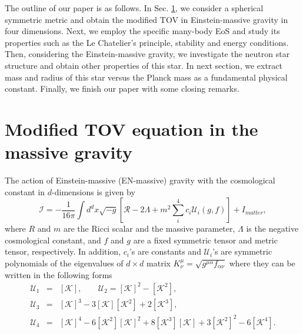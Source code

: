 \documentclass[aps]{revtex4}
\begin{document}
The outline of our paper is as follows. In Sec. \ref{ModTOV}, we consider a
spherical symmetric metric and obtain the modified TOV in Einstein-massive
gravity in four dimensions. Next, we employ the specific many-body EoS and
study its properties such as the Le Chatelier's principle, stability and
energy conditions. Then, considering the Einstein-massive gravity, we
investigate the neutron star structure and obtain other properties of this
star. In next section, we extract mass and radius of this star versus the
Planck mass as a fundamental physical constant. Finally, we finish our paper
with some closing remarks.

\section{Modified TOV equation in the massive gravity}\label{ModTOV}

The action of Einstein-massive (EN-massive) gravity with the cosmological
constant in $d$-dimensions is given by
\begin{equation}
\mathcal{I}=-\frac{1}{16\pi }\int d^{d}x\sqrt{-g}\left[ \mathcal{R}-2\Lambda
+m^{2}\sum_{i}^{4}c_{i}\mathcal{U}_{i}(g,f)\right] +I_{matter},
\label{Action}
\end{equation}%
where $R$ and $m$ are the Ricci scalar and the massive parameter, $\Lambda $
is the negative cosmological constant, and $f$ and $g$ are a fixed symmetric
tensor and metric tensor, respectively. In addition, $c_{i}$'s are constants
and $\mathcal{U}_{i}$'s are symmetric polynomials of the eigenvalues of $%
d\times d$ matrix $K_{\nu }^{\mu }=\sqrt{g^{\mu \alpha }f_{\alpha \nu }}$
where they can be written in the following forms
\begin{eqnarray}
\mathcal{U}_{1} &=&\left[ \mathcal{K}\right] ,\;\;\;\;\;\;\;\mathcal{U}_{2}=%
\left[ \mathcal{K}\right] ^{2}-\left[ \mathcal{K}^{2}\right] ,  \nonumber \\
\mathcal{U}_{3} &=&\left[ \mathcal{K}\right] ^{3}-3\left[ \mathcal{K}\right] %
\left[ \mathcal{K}^{2}\right] +2\left[ \mathcal{K}^{3}\right] ,  \nonumber \\
\mathcal{U}_{4} &=&\left[ \mathcal{K}\right] ^{4}-6\left[ \mathcal{K}^{2}%
\right] \left[ \mathcal{K}\right] ^{2}+8\left[ \mathcal{K}^{3}\right] \left[
\mathcal{K}\right] +3\left[ \mathcal{K}^{2}\right] ^{2}-6\left[ \mathcal{K}%
^{4}\right] .  \nonumber
\end{eqnarray}
\end{document}
